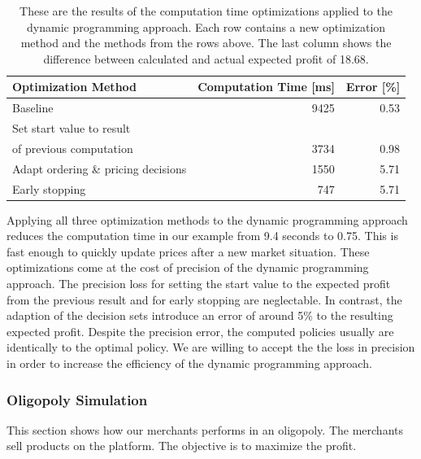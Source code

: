 \begin{table}[t]
	\centering
	\begin{tabular}{ lrr }
		\hline
		Optimization Method & Computation Time [ms] & Error [\%] \\
		\hline
		\hline
		Baseline & 9425 & 0.53 \\
		\hline
		Set start value to result \\ of previous computation & 3734 & 0.98 \\
		\hline
		Adapt ordering \& pricing decisions & 1550 & 5.71 \\
		\hline
		Early stopping & 747 & 5.71\\
		\hline
	\end{tabular}
	\caption{These are the results of the computation time optimizations applied to the dynamic programming approach.
	Each row contains a new optimization method and the methods from the rows above. The last column shows the difference between calculated and actual expected profit of 18.68.}
	\label{tab:speedup}
\end{table}

Applying all three optimization methods to the dynamic programming approach reduces the computation time in our example from 9.4 seconds to 0.75.
This is fast enough to quickly update prices after a new market situation.
These optimizations come at the cost of precision of the dynamic programming approach.
The precision loss for setting the start value to the expected profit from the previous result and for early stopping are neglectable.
In contrast, the adaption of the decision sets introduce an error of around 5\% to the resulting expected profit.
Despite the precision error, the computed policies usually are identically to the optimal policy.
We are willing to accept the the loss in precision in order to increase the efficiency of the dynamic programming approach.

\subsubsection{Oligopoly Simulation}
This section shows how our merchants performs in an oligopoly.
The merchants sell products on the \pricewars platform.
The objective is to maximize the profit.

